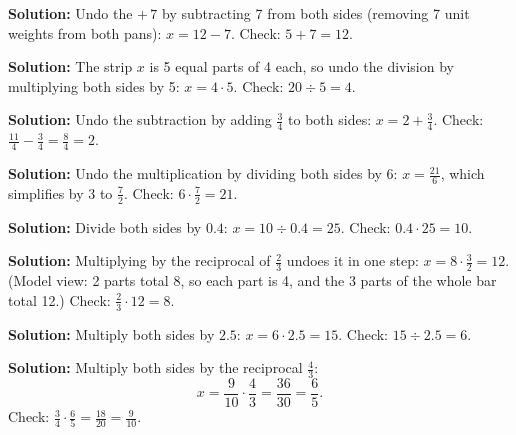 \documentclass[12pt]{article}
\begin{document}



\textbf{Solution:} Undo the $+\,7$ by subtracting 7 from both sides (removing 7 unit
weights from both pans): $x = 12 - 7$. Check: $5 + 7 = 12$. \checkmark {}


\textbf{Solution:} The strip $x$ is 5 equal parts of 4 each, so undo the division by
multiplying both sides by 5: $x = 4 \cdot 5$. Check: $20 \div 5 = 4$. \checkmark {}


\textbf{Solution:} Undo the subtraction by adding $\tfrac{3}{4}$ to both sides:
$x = 2 + \tfrac{3}{4}$. Check: $\tfrac{11}{4} - \tfrac{3}{4} = \tfrac{8}{4} = 2$.
\checkmark {}


\textbf{Solution:} Undo the multiplication by dividing both sides by 6:
$x = \tfrac{21}{6}$, which simplifies by 3 to $\tfrac{7}{2}$. Check:
$6 \cdot \tfrac{7}{2} = 21$. \checkmark {}


\textbf{Solution:} Divide both sides by $0.4$: $x = 10 \div 0.4 = 25$. Check:
$0.4 \cdot 25 = 10$. \checkmark {}


\textbf{Solution:} Multiplying by the reciprocal of $\tfrac{2}{3}$ undoes it in one
step: $x = 8 \cdot \tfrac{3}{2} = 12$. (Model view: 2 parts total 8, so each part is
4, and the 3 parts of the whole bar total 12.) Check: $\tfrac{2}{3} \cdot 12 = 8$.
\checkmark {}


\textbf{Solution:} Multiply both sides by $2.5$: $x = 6 \cdot 2.5 = 15$. Check:
$15 \div 2.5 = 6$. \checkmark {}


\textbf{Solution:} Multiply both sides by the reciprocal $\tfrac{4}{3}$:
\[ x = \frac{9}{10} \cdot \frac{4}{3} = \frac{36}{30} = \frac{6}{5}. \]
Check: $\tfrac{3}{4} \cdot \tfrac{6}{5} = \tfrac{18}{20} = \tfrac{9}{10}$.
\checkmark {}
\end{document}
